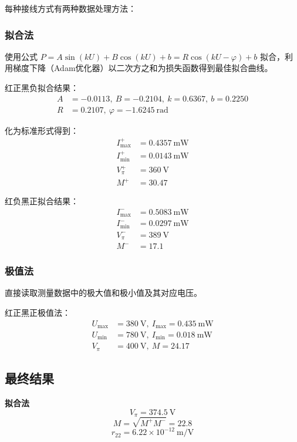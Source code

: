 \documentclass[12pt,a4paper]{article}
\begin{document}
每种接线方式有两种数据处理方法：

\subsubsection{拟合法}
使用公式 \(P = A\sin(kU) + B\cos(kU) + b = R\cos(kU-\varphi) + b\) 拟合，利用梯度下降（Adam优化器）以二次方之和为损失函数得到最佳拟合曲线。

红正黑负拟合结果：
\begin{align}
    A &= -0.0113,\ B = -0.2104,\ k = 0.6367,\ b = 0.2250 \\
    R &= 0.2107,\ \varphi = -1.6245\ \text{rad}
\end{align}

化为标准形式得到：
\begin{align}
    I_{\max}^+ &= 0.4357\ \text{mW} \\
    I_{\min}^+ &= 0.0143\ \text{mW} \\
    V_\pi^+ &= 360\ \text{V} \\
    M^+ &= 30.47
\end{align}

红负黑正拟合结果：
\begin{align}
    I_{\max}^- &= 0.5083\ \text{mW} \\
    I_{\min}^- &= 0.0297\ \text{mW} \\
    V_\pi^- &= 389\ \text{V} \\
    M^- &= 17.1
\end{align}

\subsubsection{极值法}
直接读取测量数据中的极大值和极小值及其对应电压。

红正黑正极值法：
\begin{align}
    U_{\max} &= 380\ \text{V},\ I_{\max} = 0.435\ \text{mW} \\
    U_{\min} &= 780\ \text{V},\ I_{\min} = 0.018\ \text{mW} \\
    V_\pi &= 400\ \text{V},\ M = 24.17
\end{align}

\subsection{最终结果}

\textbf{拟合法}
\begin{equation}
    \boxed{V_\pi = 374.5\ \text{V}}
\end{equation}
\begin{equation}
    \boxed{M = \sqrt{M^+ M^-} = 22.8}
\end{equation}
\begin{equation}
    \boxed{r_{22} = 6.22 \times 10^{-12}\ \text{m/V}}
\end{equation}
\end{document}
